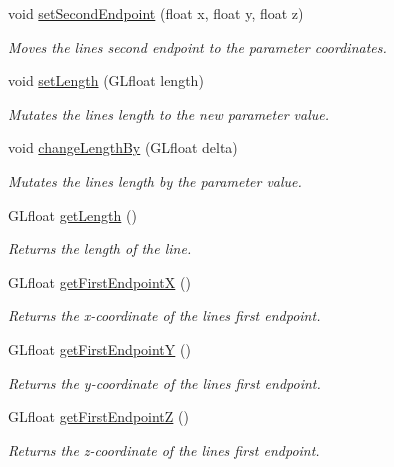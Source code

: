 \begin{DoxyCompactItemize}
void \hyperlink{classtsgl_1_1_line_adea88132b36a0ab59531133c64341bdc}{set\+Second\+Endpoint} (float x, float y, float z)
\begin{DoxyCompactList}\small\item\em Moves the line\textquotesingle{}s second endpoint to the parameter coordinates. \end{DoxyCompactList}\item 
void \hyperlink{classtsgl_1_1_line_a3f56affa11622c8f239395b3bf3214a1}{set\+Length} (G\+Lfloat length)
\begin{DoxyCompactList}\small\item\em Mutates the line\textquotesingle{}s length to the new parameter value. \end{DoxyCompactList}\item 
void \hyperlink{classtsgl_1_1_line_a08e1742777de62d8b153ab5fb0320770}{change\+Length\+By} (G\+Lfloat delta)
\begin{DoxyCompactList}\small\item\em Mutates the line\textquotesingle{}s length by the parameter value. \end{DoxyCompactList}\item 
G\+Lfloat \hyperlink{classtsgl_1_1_line_a0deafda4900d21401ab22af6c4a1d2a0}{get\+Length} ()
\begin{DoxyCompactList}\small\item\em Returns the length of the line. \end{DoxyCompactList}\item 
G\+Lfloat \hyperlink{classtsgl_1_1_line_ad47b8acab48713ff03c305c4a8071669}{get\+First\+EndpointX} ()
\begin{DoxyCompactList}\small\item\em Returns the x-\/coordinate of the line\textquotesingle{}s first endpoint. \end{DoxyCompactList}\item 
G\+Lfloat \hyperlink{classtsgl_1_1_line_aa5557e97826d20633507afe22413663d}{get\+First\+EndpointY} ()
\begin{DoxyCompactList}\small\item\em Returns the y-\/coordinate of the line\textquotesingle{}s first endpoint. \end{DoxyCompactList}\item 
G\+Lfloat \hyperlink{classtsgl_1_1_line_abea9b128dff112bb45f3e9318c160534}{get\+First\+EndpointZ} ()
\begin{DoxyCompactList}\small\item\em Returns the z-\/coordinate of the line\textquotesingle{}s first endpoint. \end{DoxyCompactList}\item 

\end{DoxyCompactItemize}
